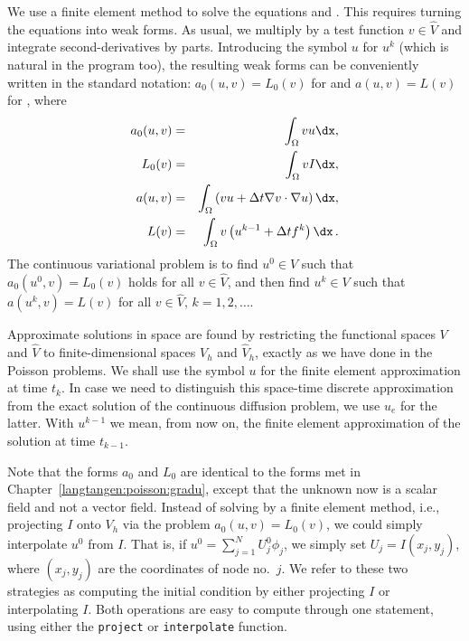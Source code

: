 We use a finite element method
to solve the
equations  and .
This requires turning the equations into weak forms.
As usual, we multiply by a test function $v\in \hat V$ and integrate
second-derivatives by parts. Introducing the symbol $u$ for $u^k$
(which is natural in the program too), the resulting weak
forms can be conveniently written in the standard notation:
$a_0(u,v)=L_0(v)$ for 
and $a(u,v)=L(v)$ for , where
\begin{eqnarray}
a_0(u,v) &=& \int_\Omega vu\dx,\label{langtangen:diffusion:pde1:a0}\\
L_0(v) &=& \int_\Omega vI\dx,\label{langtangen:diffusion:pde1:L0}\\
a(u,v) &=& \int_\Omega\left( vu + \Delta t
\nabla v\cdot\nabla u\right)\dx,\label{langtangen:diffusion:pde1:a}\\
L(v) &=& \int_\Omega v\left(u^{k-1} + \Delta t  f^k\right)\dx\langtangenep
\label{langtangen:diffusion:pde1:L}
\end{eqnarray}
The continuous variational problem is to find 
$u^0\in V$ such that $a_0(u^0,v)=L_0(v)$ holds for all $v\in\hat V$,
and then find $u^k\in V$
such that $a(u^k,v)=L(v)$ for all $v\in\hat V$,
$k=1,2,\ldots$.

Approximate solutions in space
are found by
restricting the functional spaces $V$ and $\hat V$
to finite-dimensional spaces
$V_h$ and $\hat V_h$, exactly as we have done in the Poisson problems.
We shall use the symbol $u$ for the finite element
approximation at time $t_k$. In case we need to distinguish this 
space-time discrete approximation from the exact solution of
the continuous diffusion problem, we use $u_e$ for the latter.
With $u^{k-1}$ we mean, from now on, the finite element approximation
of the solution at time $t_{k-1}$.

Note that the forms $a_0$ and $L_0$ are identical to the forms
met in Chapter~\ref{langtangen:poisson:gradu}, except that the unknown now
is a scalar field and not a vector field.
Instead of solving  by a finite
element method, i.e., projecting $I$ onto $V_h$ via
the problem $a_0(u,v)=L_0(v)$, we could simply interpolate $u^0$ from
$I$. That is, if $u^0=\sum_{j=1}^N U^0_j\phi_j$, we 
simply set $U_j=I(x_j,y_j)$, where $(x_j,y_j)$ are the coordinates of
node no.~$j$. We refer to these two strategies as computing
the initial condition by either projecting $I$ or interpolating $I$.
Both operations are easy to compute through one statement, using either
the {\fontsize{12pt}{12pt}\texttt{project}} or {\fontsize{12pt}{12pt}\texttt{interpolate}} function.


